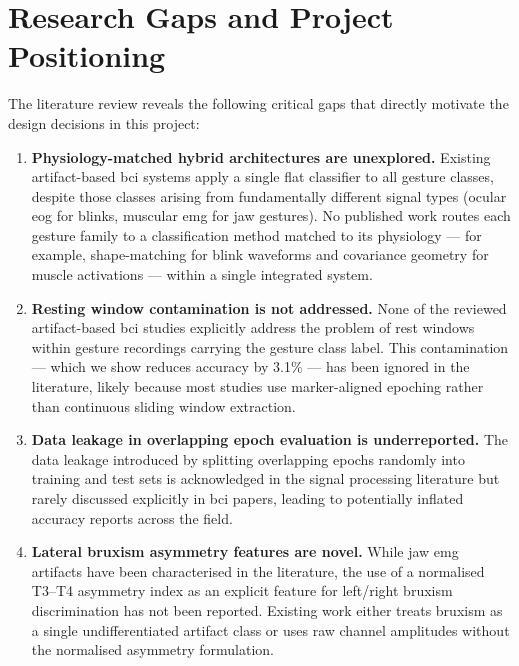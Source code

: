 \section{Research Gaps and Project Positioning}
\label{sec:rw_gaps}

The literature review reveals the following critical gaps that
directly motivate the design decisions in this project:

\begin{enumerate}[leftmargin=*, label=\textbf{G\arabic*.}]

    \item \textbf{Physiology-matched hybrid architectures are
    unexplored.} Existing artifact-based \acrshort{bci} systems apply
    a single flat classifier to all gesture classes, despite those
    classes arising from fundamentally different signal types
    (ocular \acrshort{eog} for blinks, muscular \acrshort{emg} for
    jaw gestures). No published work routes each gesture family to a
    classification method matched to its physiology --- for example,
    shape-matching for blink waveforms and covariance geometry for
    muscle activations --- within a single integrated system.

    \item \textbf{Resting window contamination is not addressed.}
    None of the reviewed artifact-based \acrshort{bci} studies
    explicitly address the problem of rest windows within gesture
    recordings carrying the gesture class label. This contamination
    — which we show reduces accuracy by 3.1\% — has been ignored
    in the literature, likely because most studies use marker-aligned
    epoching rather than continuous sliding window extraction.

    \item \textbf{Data leakage in overlapping epoch evaluation is
    underreported.} The data leakage introduced by splitting
    overlapping epochs randomly into training and test sets is
    acknowledged in the signal processing literature but rarely
    discussed explicitly in \acrshort{bci} papers, leading to
    potentially inflated accuracy reports across the field.

    \item \textbf{Lateral bruxism asymmetry features are novel.}
    While jaw \acrshort{emg} artifacts have been characterised in
    the literature, the use of a normalised T3--T4 asymmetry index
    as an explicit feature for left/right bruxism discrimination
    has not been reported. Existing work either treats bruxism as
    a single undifferentiated artifact class or uses raw channel
    amplitudes without the normalised asymmetry formulation.


\end{enumerate}
